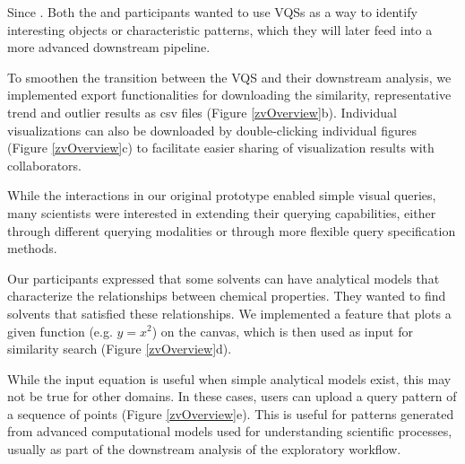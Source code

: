  Since . Both the \astro and \bio participants wanted to use VQSs as a way to identify interesting objects or characteristic patterns, which they will later feed into a more advanced downstream pipeline. 
\par To smoothen the transition between the VQS and their downstream analysis, we implemented export functionalities for downloading the similarity, representative trend and outlier results as csv files (Figure \ref{zvOverview}b). Individual visualizations can also be downloaded by double-clicking individual figures (Figure \ref{zvOverview}c) to facilitate easier sharing of visualization results with collaborators. 
\par While the interactions in our original prototype enabled simple visual queries, many scientists were interested in extending their querying capabilities, either through different querying modalities or through more flexible query specification methods.  

 Our \matsci participants expressed that some solvents can have analytical models that characterize the relationships between chemical properties. They wanted to find solvents that satisfied these relationships. We implemented a feature that plots a given function (e.g. $y=x^2$) on the canvas, which is then used as input for similarity search (Figure \ref{zvOverview}d).

 While the input equation is useful when simple analytical models exist, this may not be true for other domains. In these cases, users can upload a query pattern of a sequence of points (Figure \ref{zvOverview}e). This is useful for patterns generated from advanced computational models used for understanding scientific processes, usually as part of the downstream analysis of the exploratory workflow. %

